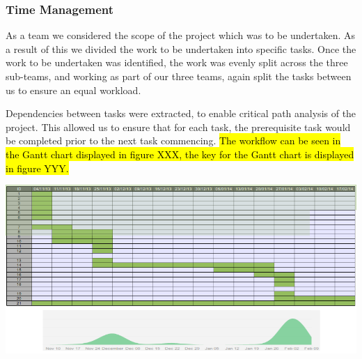 \subsubsection{Time Management}
As a team we considered the scope of the project which was to be undertaken.
 As a result of this we divided the work to be undertaken into specific tasks.
 Once the work to be undertaken was identified, the work was evenly split across 
the three sub-teams, and working as part of our three teams, again split the 
 tasks between us to ensure an equal workload.
 
Dependencies between tasks were extracted, to enable critical path analysis of the project. 
This allowed us to ensure that for each task, the prerequisite task would be completed 
prior to the next task commencing. \hl{The workflow can be seen in the Gantt chart displayed in 
figure XXX, the key for the Gantt chart is displayed in figure YYY.}

\includegraphics[scale=0.48]{images/GanttChart.png}


